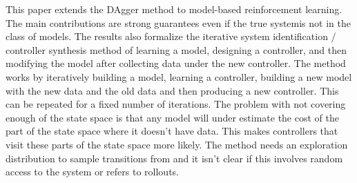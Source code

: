 \documentclass[12 pt]{article}
\begin{document}
This paper extends the DAgger method to model-based reinforcement learning. The main contributions are strong guarantees even if the true systemis not in the class of models. The results also formalize the iterative system identification / controller synthesis method of learning a model, designing a controller, and then modifying the model after collecting data under the new controller. The method works by iteratively building a model, learning a controller, building a new model with the new data and the old data and then producing a new controller. This can be repeated for a fixed number of iterations. The problem with not covering enough of the state space is that any model will under estimate the cost of the part of the state space where it doesn't have data. This makes controllers that visit these parts of the state space more likely. The method needs an exploration distribution to sample transitions from and it isn't clear if this involves random access to the system or refers to rollouts.\cite{ross2012agnostic}
\end{document}
